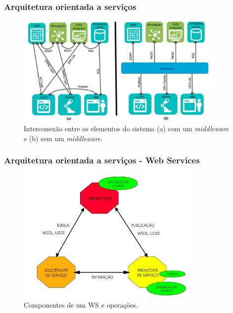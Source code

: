 \documentclass[10pt]{beamer}
\begin{document}
\begin{frame}
	
	\frametitle{Arquitetura orientada a serviços} 
	
	\begin{figure}[htb]
		\centering
		\caption{Interconexão entre os elementos do sistema (a) com um \textit{middleware} e (b) sem um \textit{middleware}.}
		\label{fig:middleware}
		\includegraphics[width=0.9\textwidth]{middleware.png}
	\end{figure}
	
\end{frame}
\begin{frame}
	
	\frametitle{Arquitetura orientada a serviços - Web Services} 
	
	\begin{figure}[htb]
		\centering
		\caption{Componentes de um WS e operações.}
		\label{fig:webservice-componentes}
		\includegraphics[width=0.8\textwidth]{webservice-componentes}
	\end{figure}
	
\end{frame}
\end{document}
